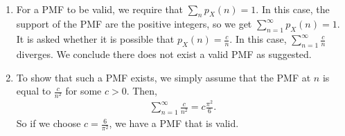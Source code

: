 
\setcounter{theorem}{9}
\begin{exercise}[BH.3.10]
\begin{solution}~
	\begin{enumerate}
		\item For a PMF to be valid, we require that $\sum_{n}p_{X}(n)=1$. In this case, the support of the PMF are the positive integers, so we get $\sum_{n=1}^{\infty}p_{X}(n)=1$. It is asked whether it is possible that $p_{X}(n) = \frac{c}{n}$. In this case, $\sum_{n=1}^{\infty}\frac{c}{n}$  diverges. We conclude there does not exist a valid PMF as suggested.
		\item To show that such a PMF exists, we simply assume that the PMF at $n$ is equal to $\frac{c}{n^2}$ for some $c>0$. Then,
		\begin{align*}
			\sum_{n=1}^{\infty}\frac{c}{n^2} = c\frac{\pi^2}{6}.
		\end{align*}
		So if we choose $c=\frac{6}{\pi^2}$, we have a PMF that is valid.
	\end{enumerate}
\end{solution}
\end{exercise}


